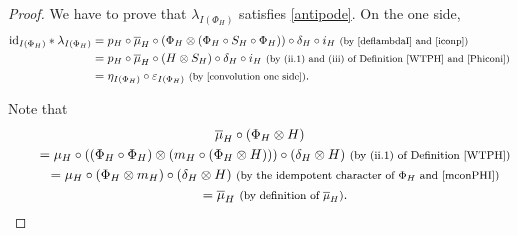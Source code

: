 \documentclass[10pt,a4paper]{amsart}
\numberwithin{equation}{section}
\begin{document}
\begin{proof}
We have to prove that $\lambda_{I(\Phi_{H})}$ satisfies \eqref{antipode}. On the one side,
\begin{align*}
{\rm id}_{I(\Phi_{H})}\ast \lambda_{I(\Phi_{H})}
={}&p_{H}\circ\overline{\mu}_{H}\circ(\Phi_{H}\otimes(\Phi_{H}\circ S_{H}\circ \Phi_{H}))\circ\delta_{H}\circ i_{H}\ \text{\footnotesize\textnormal{(by \eqref{deflambdaI} and \eqref{iconp})}}\\
={}&p_{H}\circ \overline{\mu}_{H}\circ(H\otimes S_{H})\circ\delta_{H}\circ i_{H}\ \text{\footnotesize\textnormal{(by (ii.1) and (iii) of Definition \ref{WTPH} and \eqref{Phiconi})}}\\
={}&\eta_{I(\Phi_{H})}\circ\varepsilon_{I(\Phi_{H})}\ \text{\footnotesize\textnormal{(by \eqref{convolution one side})}}.
\end{align*}

Note that
\begin{gather}
\overline{\mu}_{H}\circ(\Phi_{H}\otimes H)\nonumber\\
\qquad{} =\mu_{H}\circ((\Phi_{H}\circ \Phi_{H})\otimes(m_{H}\circ(\Phi_{H}\otimes H)))\circ(\delta_{H}\otimes H)\ \text{\footnotesize\textnormal{(by (ii.1) of Definition \ref{WTPH})}}\nonumber\\
\qquad{} =\mu_{H}\circ(\Phi_{H}\otimes m_{H})\circ(\delta_{H}\otimes H)\ \text{\footnotesize\textnormal{(by the idempotent character of $\Phi_{H}$ and \eqref{mconPHI})}}\nonumber\\
\qquad{} =\overline{\mu}_{H}\ \text{\footnotesize\textnormal{(by definition of $\overline{\mu}_{H}$)}}.\label{barmuPhi}
\end{gather}


\end{proof}
\end{document}
